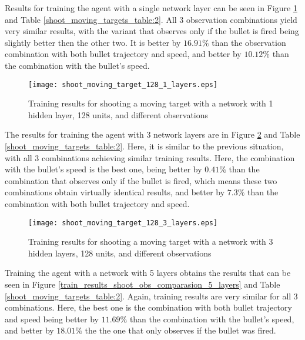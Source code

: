 Results for training the agent with a single network layer can be seen in Figure \ref{train_results_shoot_obs_comparasion_1_layers} and Table \ref{shoot_moving_targets_table:2}. All 3 observation combinations yield very similar results, with the variant that observes only if the bullet is fired being slightly better then the other two. It is better by $16.91\%$ than the observation combination with both bullet trajectory and speed, and better by $10.12\%$ than the combination with the bullet's speed.

\begin{figure}
    \begin{center}
        \texttt{[image: shoot\_moving\_target\_128\_1\_layers.eps]}
        \caption{Training results for shooting a moving target with a network with 1 hidden layer, 128 units, and different observations}
        \label{train_results_shoot_obs_comparasion_1_layers}
    \end{center}
\end{figure}

The results for training the agent with 3 network layers are in Figure \ref{train_results_shoot_obs_comparasion_3_layers} and Table \ref{shoot_moving_targets_table:2}. Here, it is similar to the previous situation, with all 3 combinations achieving similar training results. Here, the combination with the bullet's speed is the best one, being better by $0.41\%$ than the combination that observes only if the bullet is fired, which means these two combinations obtain virtually identical results, and better by $7.3\%$ than the combination with both bullet trajectory and speed.

\begin{figure}
    \begin{center}
        \texttt{[image: shoot\_moving\_target\_128\_3\_layers.eps]}
        \caption{Training results for shooting a moving target with a network with 3 hidden layers, 128 units, and different observations}
        \label{train_results_shoot_obs_comparasion_3_layers}
    \end{center}
\end{figure}

Training the agent with a network with 5 layers obtains the results that can be seen in Figure \ref{train_results_shoot_obs_comparasion_5_layers} and Table \ref{shoot_moving_targets_table:2}. Again, training results are very similar for all 3 combinations. Here, the best one is the combination with both bullet trajectory and speed being better by $11.69\%$ than the combination with the bullet's speed, and better by $18.01\%$ the the one that only observes if the bullet was fired.

